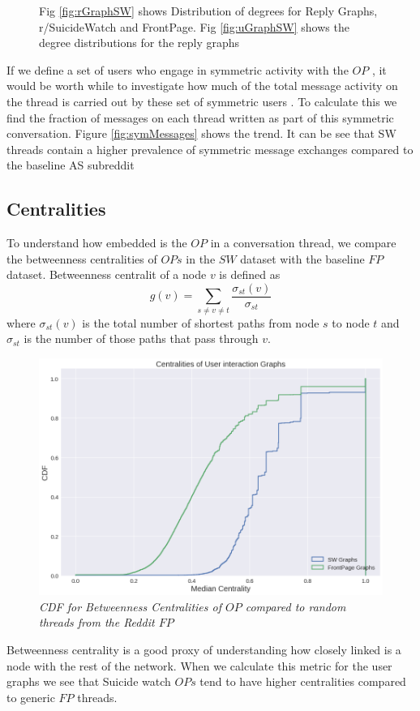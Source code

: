 \begin{figure}[!ht]
	\centering
\caption{Fig \ref{fig:rGraphSW} shows Distribution of degrees for Reply Graphs,  r/SuicideWatch and FrontPage. Fig \ref{fig:uGraphSW} shows the degree distributions for the reply graphs}
\end{figure}


If we define a set of users who engage in symmetric activity with the $OP$ , it would be worth while to investigate how much of the total message activity on the thread is carried out by these set of symmetric users . To calculate this we find the fraction of messages on each thread written as part of this symmetric conversation. Figure \ref{fig:symMessages} shows the trend. It can be see that SW threads contain a higher prevalence of symmetric message exchanges compared to the baseline AS subreddit 

\subsection{Centralities}
To understand how embedded is the $OP$ in a conversation thread, we compare the betweenness centralities of $OPs$ in the $SW$ dataset with the baseline $FP$ dataset. 
Betweenness centralit of a node $v$ is defined as 
\begin{equation}
	g(v) = \sum_{s \neq v \neq t}\frac{\sigma_{st}(v)}{\sigma_{st}}
\end{equation}
where $\sigma_{st}(v)$ is the total number of shortest paths from node $s$ to node $t$ and $\sigma_{st}$ is the number of those paths that pass through $v$.
\begin{figure}[!h]
	\centering
	\includegraphics[width=0.5\columnwidth]{Figures/Betweenness_SW_FP}
	\caption{\textsl{ CDF for Betweenness Centralities of $OP$ compared to random threads from the Reddit $FP$ }}
	\label{fig:centralities}
\end{figure}
Betweenness centrality is a good proxy of understanding how closely linked is a node with the rest of the network. When we calculate this metric for the user graphs we see that Suicide watch $OPs$ tend to have higher centralities compared to generic $FP$ threads. 
